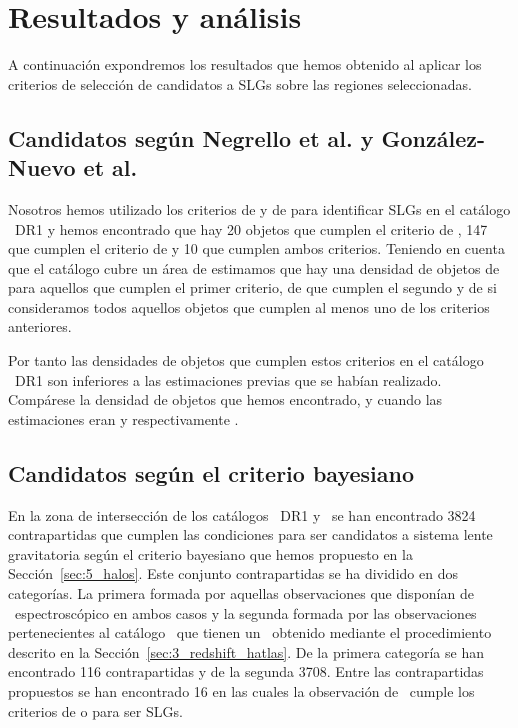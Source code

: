 \section{Resultados y análisis}\label{sec:6_resultados}

A continuación expondremos los resultados que hemos obtenido al aplicar los criterios de selección de candidatos a SLGs sobre las regiones seleccionadas.

\subsection{Candidatos según Negrello et al. y González-Nuevo et al. }\label{subsec:resultados_criterios_anteriores}

Nosotros hemos utilizado los criterios de \cite{article:Negrello_2010} y de \cite{article:Nuevo_2012} para identificar SLGs en el catálogo \hatlas\ DR1 y hemos encontrado que hay 20 objetos que cumplen el criterio de \cite{article:Negrello_2010}, 147 que cumplen el criterio de \cite{article:Nuevo_2012} y 10 que cumplen ambos criterios. Teniendo en cuenta que el catálogo cubre un área de  estimamos que hay una densidad de objetos de  para aquellos que cumplen el primer criterio, de  que cumplen el segundo y de  si consideramos todos aquellos objetos que cumplen al menos uno de los criterios anteriores. 

Por tanto las densidades de objetos que cumplen estos criterios en el catálogo \hatlas\ DR1 son inferiores a las estimaciones previas que se habían realizado. Compárese la densidad de objetos que hemos encontrado,  y   cuando las estimaciones eran  y  respectivamente \citep{article:Nuevo_2012}.

\subsection{Candidatos según el criterio bayesiano}\label{subsec:6_slgs_propuestos}

En la zona de intersección de los catálogos \hatlas\ DR1 y \gama\  se han encontrado 3824 contrapartidas que cumplen las condiciones para ser candidatos a sistema lente gravitatoria según el criterio bayesiano que hemos propuesto en la Sección~\ref{sec:5_halos}. Este conjunto contrapartidas se ha dividido en dos categorías. La primera formada por aquellas observaciones que disponían de \rt\ espectroscópico en ambos casos y la segunda formada por las observaciones pertenecientes al catálogo \hatlas\ que tienen un \rt\ obtenido mediante el procedimiento descrito en la Sección~\ref{sec:3_redshift_hatlas}. De la primera categoría se han encontrado 116 contrapartidas y de la segunda 3708. Entre las contrapartidas propuestos se han encontrado 16 en las cuales la observación de \hatlas\ cumple los criterios de \cite{article:Nuevo_2012} o \cite{article:Negrello_2010} para ser SLGs. 

